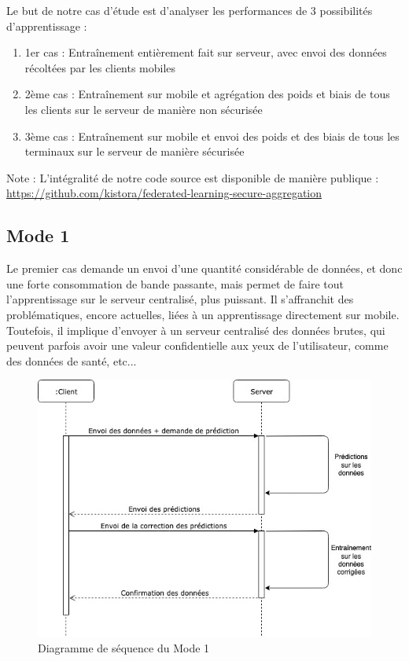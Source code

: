 \documentclass{article}
\begin{document}
    Le but de notre cas d'étude est d'analyser les performances de 3 possibilités d'apprentissage :
\begin{enumerate}
    \item 1er cas : Entraînement entièrement fait sur serveur, avec envoi des données récoltées par les clients mobiles
    \item 2ème cas : Entraînement sur mobile et agrégation des poids et biais de tous les clients sur le serveur de manière non sécurisée
    \item 3ème cas : Entraînement sur mobile et envoi des poids et des biais de tous les terminaux sur le serveur de manière sécurisée
\end{enumerate}
\medskip

Note : L'intégralité de notre code source est disponible de manière publique : \newline \href{https://github.com/kistora/federated-learning-secure-aggregation}{https://github.com/kistora/federated-learning-secure-aggregation}

\subsection{Mode 1}
Le premier cas demande un envoi d'une quantité considérable de données, et donc une forte consommation de bande passante, mais permet de faire tout l'apprentissage sur le serveur centralisé, plus puissant. Il s'affranchit des problématiques, encore actuelles, liées à un apprentissage directement sur mobile. Toutefois, il implique d'envoyer à un serveur centralisé des données brutes, qui peuvent parfois avoir une valeur confidentielle aux yeux de l'utilisateur, comme des données de santé, etc...

    \begin{figure}[H]
     \includegraphics[width=\textwidth]{img/MODE_1_SEQ.jpg}
    \caption{Diagramme de séquence du Mode 1}
    \end{figure}
    
\end{document}
